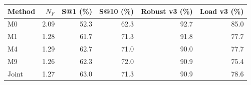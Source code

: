\begin{tabular}{lrrrrr}
\toprule
Method & $N_F$ & S@1 (\%) & S@10 (\%) & Robust v3 (\%) & Load v3 (\%) \\
\midrule
M0 & 2.09 & 52.3 & 62.3 & 92.7 & 85.0 \\
M1 & 1.28 & 61.7 & 71.3 & 91.8 & 77.7 \\
M4 & 1.29 & 62.7 & 71.0 & 90.0 & 77.7 \\
M9 & 1.26 & 62.3 & 72.0 & 90.9 & 75.4 \\
Joint & 1.27 & 63.0 & 71.3 & 90.9 & 78.6 \\
\bottomrule
\end{tabular}
